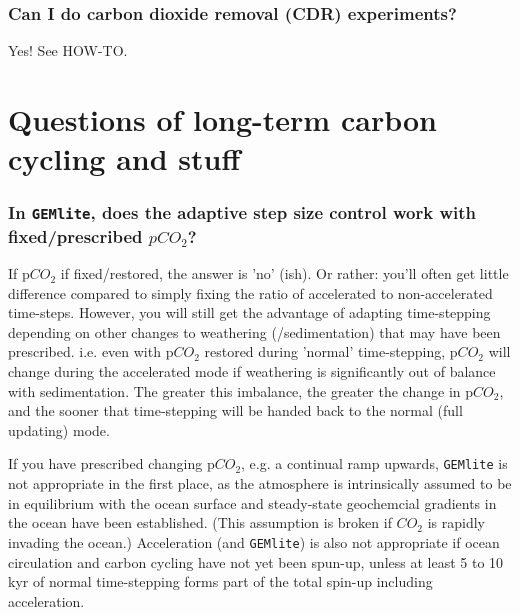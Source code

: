 \documentclass[11pt,fleqn]{book} %
\begin{document}
%
\subsubsection{Can I do carbon dioxide removal (CDR) experiments?}

Yes! See HOW-TO.


\newpage


\section{Questions of long-term carbon cycling and stuff}

%
\subsubsection{In \texttt{GEMlite}, does the adaptive step size control work with fixed/prescribed \(pCO_{2}\)?}

If p\(CO_{2}\) if fixed/restored, the answer is 'no' (ish). Or rather: you'll often get little difference compared to simply fixing the ratio of accelerated to 
non-accelerated time-steps.
However, you will still get the advantage of adapting time-stepping depending on other changes to weathering (/sedimentation) that may have been prescribed. i.e. even with p\(CO_{2}\) restored during 'normal' time-stepping, p\(CO_{2}\) will change during the accelerated mode if weathering is significantly out of balance with sedimentation. The greater this imbalance, the greater the change in p\(CO_{2}\), and the sooner that time-stepping will be handed back to the normal (full updating) mode.

If you have prescribed changing p\(CO_{2}\), e.g. a continual ramp upwards, \texttt{GEMlite} is not appropriate in the first place, as the atmosphere is intrinsically assumed to be in equilibrium with the ocean surface and steady-state geochemcial gradients in the ocean have been established. (This assumption is broken if \(CO_{2}\) is rapidly invading the ocean.)
Acceleration (and \texttt{GEMlite}) is also not appropriate if  ocean circulation and carbon cycling have not yet been spun-up, unless at least 5 to 10 kyr of normal time-stepping forms part of the total spin-up including acceleration. 
%
\end{document}
